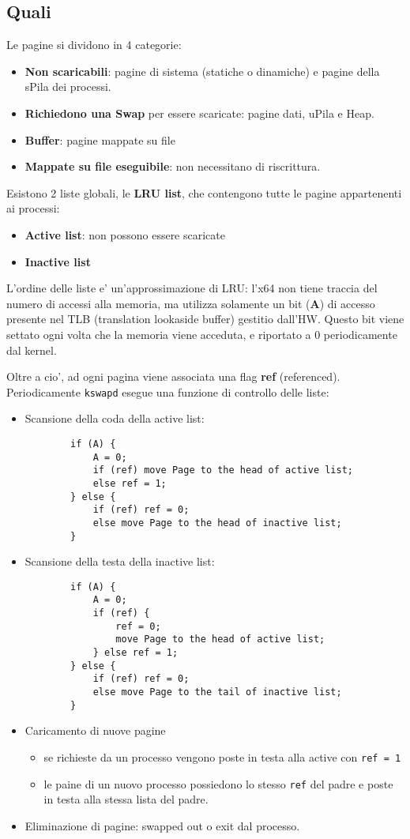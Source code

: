 \documentclass[12pt, a4paper]{report}
\begin{document}
\subsection{Quali}
Le pagine si dividono in 4 categorie:
\begin{itemize}
	\item \textbf{Non scaricabili}: pagine di sistema (statiche o dinamiche) e
		pagine della sPila dei processi.
	\item \textbf{Richiedono una Swap} per essere scaricate: pagine dati, uPila
		e Heap.
	\item \textbf{Buffer}: pagine mappate su file
	\item \textbf{Mappate su file eseguibile}: non necessitano di riscrittura.
\end{itemize}
Esistono 2 liste globali, le \textbf{LRU list}, che contengono tutte le pagine
appartenenti ai processi:
\begin{itemize}
	\item \textbf{Active list}: non possono essere scaricate
	\item \textbf{Inactive list}
\end{itemize}
L'ordine delle liste e' un'approssimazione di LRU: l'x64 non tiene traccia del
numero di accessi alla memoria, ma utilizza solamente un bit (\textbf{A}) di
accesso presente nel TLB (translation lookaside buffer) gestitio dall'HW. Questo
bit viene settato ogni volta che la memoria viene acceduta, e riportato a 0
periodicamente dal kernel.

Oltre a cio', ad ogni pagina viene associata una flag \textbf{ref} (referenced).
Periodicamente \texttt{kswapd} esegue una funzione di controllo delle liste:
\begin{itemize}
	\item Scansione della coda della active list:
		\begin{verbatim}
		if (A) {
		    A = 0;
		    if (ref) move Page to the head of active list;
		    else ref = 1;
		} else {
		    if (ref) ref = 0;
		    else move Page to the head of inactive list;
		}
		\end{verbatim}
	\item Scansione della testa della inactive list:
		\begin{verbatim}
		if (A) {
		    A = 0;
		    if (ref) {
			    ref = 0;
				move Page to the head of active list;
			} else ref = 1;
		} else {
		    if (ref) ref = 0;
		    else move Page to the tail of inactive list;
		}
		\end{verbatim}
	\item Caricamento di nuove pagine
		\begin{itemize}
			\item se richieste da un processo vengono poste in testa alla active
				con \texttt{ref = 1}
			\item le paine di un nuovo processo possiedono lo stesso
				\texttt{ref} del padre e poste in testa alla stessa lista del
				padre.
		\end{itemize}
	\item Eliminazione di pagine: swapped out o exit dal processo.
\end{itemize}
\end{document}

